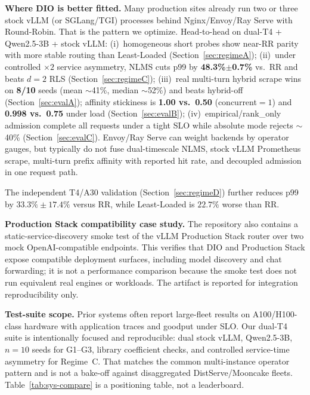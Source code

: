 \documentclass[pdflatex,sn-mathphys-num]{sn-jnl}
\begin{document}
\textbf{Where DIO is better fitted.}
Many production sites already run two or three stock vLLM (or SGLang/TGI) processes
behind Nginx/Envoy/Ray Serve with Round-Robin. That is the pattern we optimize.
Head-to-head on dual-T4 + Qwen2.5-3B + stock vLLM: (i)~homogeneous short probes show
near-RR parity with more stable routing than Least-Loaded
(Section~\ref{sec:regimeA}); (ii)~under controlled $\times 2$ service asymmetry, NLMS
cuts p99 by \textbf{48.3\%$\pm$0.7\%} vs.\ RR and beats $d{=}2$ RLS
(Section~\ref{sec:regimeC}); (iii)~real multi-turn hybrid scrape wins on
\textbf{8/10} seeds (mean $\sim$41\%, median $\sim$52\%) and beats hybrid-off
(Section~\ref{sec:evalA}); affinity stickiness is \textbf{1.00 vs.\ 0.50}
(concurrent$=1$) and \textbf{0.998 vs.\ 0.75} under load (Section~\ref{sec:evalB});
(iv)~empirical/rank\_only admission complete all requests under a tight SLO while
absolute mode rejects $\sim$40\% (Section~\ref{sec:evalC}). Envoy/Ray Serve can weight
backends by operator gauges, but typically do not fuse dual-timescale NLMS, stock
vLLM Prometheus scrape, multi-turn prefix affinity with reported hit rate, and
decoupled admission in one request path.

The independent T4/A30 validation (Section~\ref{sec:regimeD}) further reduces p99
by $33.3\%\pm17.4\%$ versus RR, while Least-Loaded is $22.7\%$ worse than RR.

\textbf{Production Stack compatibility case study.}
The repository also contains a static-service-discovery smoke test of the vLLM
Production Stack router over two mock OpenAI-compatible endpoints. This verifies
that DIO and Production Stack expose compatible deployment surfaces, including
model discovery and chat forwarding; it is not a performance comparison because
the smoke test does not run equivalent real engines or workloads. The artifact is
reported for integration reproducibility only.

\textbf{Test-suite scope.}
Prior systems often report large-fleet results on A100/H100-class hardware with
application traces and goodput under SLO. Our dual-T4 suite is intentionally focused
and reproducible: dual stock vLLM, Qwen2.5-3B, $n{=}10$ seeds for G1--G3, library
coefficient checks, and controlled service-time asymmetry for Regime~C. That matches
the common multi-instance operator pattern and is not a bake-off against disaggregated
DistServe/Mooncake fleets. Table~\ref{tab:sys-compare} is a positioning table, not a
leaderboard.

\end{document}
